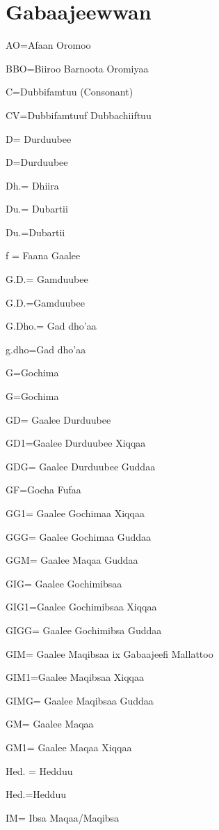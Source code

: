 \documentclass[11pt,b5paper]{book}
\begin{document}
\section*{Gabaajeewwan}
\begin{description}
    \item AO=Afaan Oromoo
  \item BBO=Biiroo Barnoota Oromiyaa
  \item C=Dubbifamtuu (Consonant)
  \item CV=Dubbifamtuuf Dubbachiiftuu
  \item D= Durduubee 
  \item D=Durduubee
  \item Dh.= Dhiira 
  \item Du.= Dubartii 
  \item Du.=Dubartii
  \item f = Faana Gaalee
  \item G.D.= Gamduubee 
  \item G.D.=Gamduubee
  \item G.Dho.= Gad dho’aa 
  \item g.dho=Gad dho'aa
  \item G=Gochima
  \item G=Gochima 
  \item GD= Gaalee Durduubee 
  \item GD1=Gaalee Durduubee Xiqqaa
  \item GDG= Gaalee Durduubee Guddaa 
  \item GF=Gocha Fufaa 
  \item GG1= Gaalee Gochimaa Xiqqaa 
  \item GGG= Gaalee Gochimaa Guddaa 
  \item GGM= Gaalee Maqaa Guddaa 
  \item GIG= Gaalee Gochimibsaa
  \item GIG1=Gaalee Gochimibsaa Xiqqaa
  \item GIGG= Gaalee Gochimibsa Guddaa 
  \item GIM= Gaalee Maqibsaa ix Gabaajeefi Mallattoo 
  \item GIM1=Gaalee Maqibsaa Xiqqaa
  \item GIMG= Gaalee Maqibsaa Guddaa 
  \item GM= Gaalee Maqaa 
  \item GM1= Gaalee Maqaa Xiqqaa 
  \item Hed. = Hedduu 
  \item Hed.=Hedduu
  \item IM= Ibsa Maqaa/Maqibsa 

\end{description}
\end{document}
